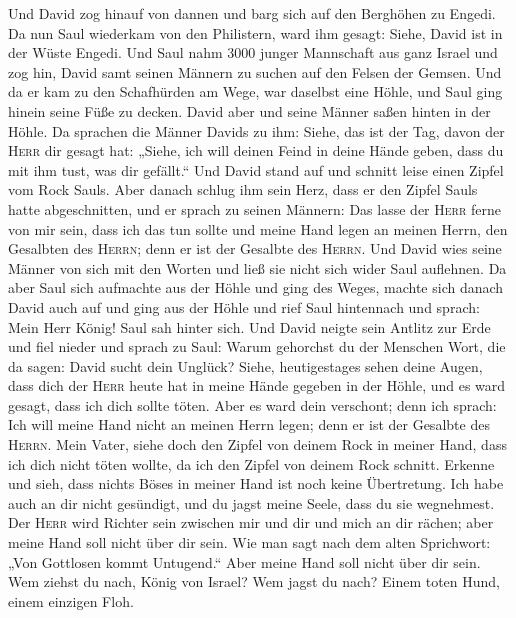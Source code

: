  Und David zog hinauf von dannen und barg sich auf den
Berghöhen zu Engedi.  Da nun Saul wiederkam von den
Philistern, ward ihm gesagt: Siehe, David ist in der Wüste Engedi.
 Und Saul nahm 3000 junger Mannschaft aus ganz Israel und
zog hin, David samt seinen Männern zu suchen auf den Felsen der Gemsen.
 Und da er kam zu den Schafhürden am Wege, war daselbst
eine Höhle, und Saul ging hinein seine Füße zu decken. David aber und
seine Männer saßen hinten in der Höhle.  Da sprachen die
Männer Davids zu ihm: Siehe, das ist der Tag, davon der \textsc{Herr}
dir gesagt hat: „Siehe, ich will deinen Feind in deine Hände geben, dass
du mit ihm tust, was dir gefällt.`` Und David stand auf und schnitt
leise einen Zipfel vom Rock Sauls.  Aber danach schlug ihm
sein Herz, dass er den Zipfel Sauls hatte abgeschnitten, 
und er sprach zu seinen Männern: Das lasse der \textsc{Herr} ferne von
mir sein, dass ich das tun sollte und meine Hand legen an meinen Herrn,
den Gesalbten des \textsc{Herrn}; denn er ist der Gesalbte des
\textsc{Herrn}.  Und David wies seine Männer von sich mit
den Worten und ließ sie nicht sich wider Saul auflehnen. Da aber Saul
sich aufmachte aus der Höhle und ging des Weges,  machte
sich danach David auch auf und ging aus der Höhle und rief Saul
hintennach und sprach: Mein Herr König! Saul sah hinter sich. Und David
neigte sein Antlitz zur Erde und fiel nieder  und sprach
zu Saul: Warum gehorchst du der Menschen Wort, die da sagen: David sucht
dein Unglück?  Siehe, heutigestages sehen deine Augen,
dass dich der \textsc{Herr} heute hat in meine Hände gegeben in der
Höhle, und es ward gesagt, dass ich dich sollte töten. Aber es ward dein
verschont; denn ich sprach: Ich will meine Hand nicht an meinen Herrn
legen; denn er ist der Gesalbte des \textsc{Herrn}.  Mein
Vater, siehe doch den Zipfel von deinem Rock in meiner Hand, dass ich
dich nicht töten wollte, da ich den Zipfel von deinem Rock schnitt.
Erkenne und sieh, dass nichts Böses in meiner Hand ist noch keine
Übertretung. Ich habe auch an dir nicht gesündigt, und du jagst meine
Seele, dass du sie wegnehmest.  Der \textsc{Herr} wird
Richter sein zwischen mir und dir und mich an dir rächen; aber meine
Hand soll nicht über dir sein.  Wie man sagt nach dem
alten Sprichwort: „Von Gottlosen kommt Untugend.`` Aber meine Hand soll
nicht über dir sein.  Wem ziehst du nach, König von
Israel? Wem jagst du nach? Einem toten Hund, einem einzigen Floh.

